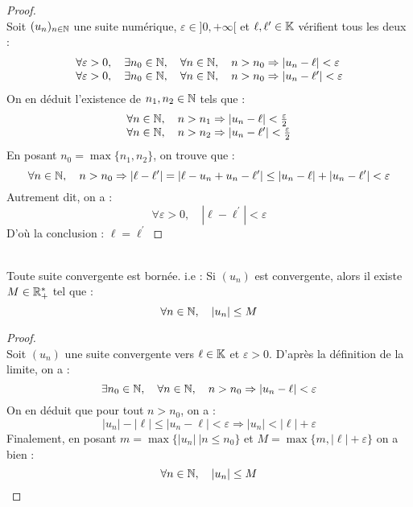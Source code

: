     \begin{proof}
        \ \\
        Soit \((u_n)_{n\in\mathbb{N}}\) une suite numérique, \(\varepsilon \in ]0, +\infty[ \) et \(\ell, \ell^{\prime} \in \mathbb{K}\) vérifient tous les deux :
        \[
            \begin{array}{l}
                \forall \varepsilon > 0, \quad \exists n_0 \in \mathbb{N}, \quad \forall n \in \mathbb{N}, \quad n > n_0 \Rightarrow |u_n - \ell| < \varepsilon\\
                \forall \varepsilon > 0, \quad \exists n_0 \in \mathbb{N}, \quad \forall n \in \mathbb{N}, \quad n > n_0 \Rightarrow |u_n - \ell^{\prime}| < \varepsilon\\
            \end{array}
        \]
        On en déduit l'existence de \(n_1, n_2 \in \mathbb{N}\) tels que :
        \[
            \begin{array}{l}
                \forall n \in \mathbb{N},\quad n > n_1 \Rightarrow |u_n - \ell| < \frac{\varepsilon}{2}\\
                \forall n \in \mathbb{N},\quad n > n_2 \Rightarrow |u_n - \ell^{\prime}| < \frac{\varepsilon}{2}\\
            \end{array}    
        \]
        En posant \(n_0 = \max{\{n_1, n_2\}}\), on trouve que :
        \[
            \forall n \in \mathbb{N},\quad n > n_0 \Rightarrow |\ell - \ell^{\prime}| = |\ell - u_n + u_n - \ell^{\prime}| \le |u_n - \ell| + |u_n - \ell^{\prime}| < \varepsilon
        \]
        Autrement dit, on a :
        \[
            \forall \varepsilon > 0, \quad |\ell - \ell^{\prime}| < \varepsilon 
        \]
        D'où la conclusion : \(\ell =  \ell^{\prime}\)
    \end{proof}

    \begin{theorem}
        \ \\
        Toute suite convergente est bornée. i.e : Si \((u_n)\) est convergente, alors il existe \(M \in \mathbb{R}^{*}_{+}\) tel que :
        \[\forall n \in \mathbb{N}, \quad |u_n| \le M\]
    \end{theorem}

    \begin{proof}
        \ \\
        Soit \((u_n)\) une suite convergente vers \(\ell \in  \mathbb{K}\) et \(\varepsilon > 0\). D'après la définition de la limite, on a :
        \[
            \exists n_0 \in \mathbb{N}, \quad \forall n \in \mathbb{N}, \quad n > n_0 \Rightarrow |u_n - \ell| < \varepsilon    
        \]
        On en déduit que pour tout \(n>n_0\), on a :
        \[
            |u_n| - |\ell| \le |u_n - \ell| < \varepsilon \Rightarrow |u_n| < |\ell| +\varepsilon     
        \]
        Finalement, en posant \(m = \max{\{|u_n|\ | n \le n_0\}}\) et \(M = \max{\{m, |\ell| + \varepsilon\}}\) on a bien :
        \[\forall n \in \mathbb{N}, \quad |u_n| \le M\]
    \end{proof}

